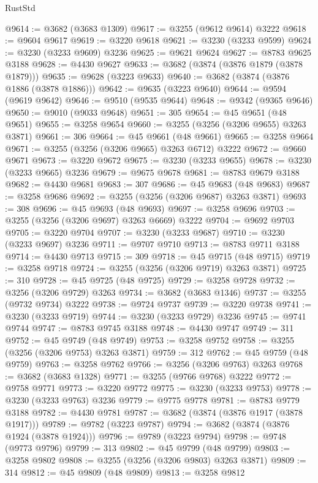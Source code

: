 \begin{lexlean}{RustStd}
\begin{coremodule}
@9614 := @3682 (@3683 @1309)
@9617 := @3255 (@9612 @9614) @3222
@9618 := @9604 @9617
@9619 := @3220 @9618
@9621 := @3230 (@3233 @9599)
@9624 := @3230 (@3233 @9609) @3236
@9625 := @9621 @9624
@9627 := @8783 @9625 @3188
@9628 := @4430 @9627
@9633 := @3682 (@3874 (@3876 @1879 (@3878 @1879)))
@9635 := @9628 (@3223 @9633)
@9640 := @3682 (@3874 (@3876 @1886 (@3878 @1886)))
@9642 := @9635 (@3223 @9640)
@9644 := @9594 (@9619 @9642)
@9646 := @9510 (@9535 @9644)
@9648 := @9342 (@9365 @9646)
@9650 := @9010 (@9033 @9648)
@9651 := 305
@9654 := @45 @9651 (@48 @9651)
@9655 := @3258 @9654
@9660 := @3255 (@3256 (@3206 @9655) @3263 @3871)
@9661 := 306
@9664 := @45 @9661 (@48 @9661)
@9665 := @3258 @9664
@9671 := @3255 (@3256 (@3206 @9665) @3263 @6712) @3222
@9672 := @9660 @9671
@9673 := @3220 @9672
@9675 := @3230 (@3233 @9655)
@9678 := @3230 (@3233 @9665) @3236
@9679 := @9675 @9678
@9681 := @8783 @9679 @3188
@9682 := @4430 @9681
@9683 := 307
@9686 := @45 @9683 (@48 @9683)
@9687 := @3258 @9686
@9692 := @3255 (@3256 (@3206 @9687) @3263 @3871)
@9693 := 308
@9696 := @45 @9693 (@48 @9693)
@9697 := @3258 @9696
@9703 := @3255 (@3256 (@3206 @9697) @3263 @6669) @3222
@9704 := @9692 @9703
@9705 := @3220 @9704
@9707 := @3230 (@3233 @9687)
@9710 := @3230 (@3233 @9697) @3236
@9711 := @9707 @9710
@9713 := @8783 @9711 @3188
@9714 := @4430 @9713
@9715 := 309
@9718 := @45 @9715 (@48 @9715)
@9719 := @3258 @9718
@9724 := @3255 (@3256 (@3206 @9719) @3263 @3871)
@9725 := 310
@9728 := @45 @9725 (@48 @9725)
@9729 := @3258 @9728
@9732 := @3256 (@3206 @9729) @3263
@9734 := @3682 (@3683 @1346)
@9737 := @3255 (@9732 @9734) @3222
@9738 := @9724 @9737
@9739 := @3220 @9738
@9741 := @3230 (@3233 @9719)
@9744 := @3230 (@3233 @9729) @3236
@9745 := @9741 @9744
@9747 := @8783 @9745 @3188
@9748 := @4430 @9747
@9749 := 311
@9752 := @45 @9749 (@48 @9749)
@9753 := @3258 @9752
@9758 := @3255 (@3256 (@3206 @9753) @3263 @3871)
@9759 := 312
@9762 := @45 @9759 (@48 @9759)
@9763 := @3258 @9762
@9766 := @3256 (@3206 @9763) @3263
@9768 := @3682 (@3683 @1328)
@9771 := @3255 (@9766 @9768) @3222
@9772 := @9758 @9771
@9773 := @3220 @9772
@9775 := @3230 (@3233 @9753)
@9778 := @3230 (@3233 @9763) @3236
@9779 := @9775 @9778
@9781 := @8783 @9779 @3188
@9782 := @4430 @9781
@9787 := @3682 (@3874 (@3876 @1917 (@3878 @1917)))
@9789 := @9782 (@3223 @9787)
@9794 := @3682 (@3874 (@3876 @1924 (@3878 @1924)))
@9796 := @9789 (@3223 @9794)
@9798 := @9748 (@9773 @9796)
@9799 := 313
@9802 := @45 @9799 (@48 @9799)
@9803 := @3258 @9802
@9808 := @3255 (@3256 (@3206 @9803) @3263 @3871)
@9809 := 314
@9812 := @45 @9809 (@48 @9809)
@9813 := @3258 @9812

\end{coremodule}
\end{lexlean}

